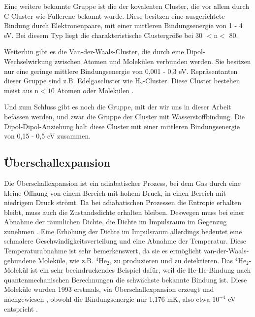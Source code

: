 Eine weitere bekannte Gruppe ist die der kovalenten Cluster, die vor allem durch C-Cluster wie Fullerene bekannt wurde. Diese besitzen eine ausgerichtete Bindung durch Elektronenpaare, mit einer mittleren Bindungsenergie von 1 - 4 eV. Bei diesem Typ liegt die charakteristische Clustergröße bei 30 $\mathrm{< n <}$ 80.

Weiterhin gibt es die Van-der-Waals-Cluster, die durch eine Dipol-Wechselwirkung zwischen Atomen und Molekülen verbunden werden. Sie besitzen nur eine geringe mittlere Bindungsenergie von 0,001 - 0,3 eV. Repräsentanten dieser Gruppe sind z.B. Edelgascluster wie $\mathrm{H}_2$-Cluster. Diese Cluster bestehen meist aus $\mathrm{n < 10}$ Atomen oder Molekülen .

Und zum Schluss gibt es noch die Gruppe, mit der wir uns in dieser Arbeit befassen werden, und zwar die Gruppe der Cluster mit Wasserstoffbindung. Die Dipol-Dipol-Anziehung hält diese Cluster mit einer mittleren Bindungsenergie von 0,15 - 0,5 eV zusammen. \\


\subsection{Überschallexpansion} \label{sec:uberschallexp}

Die Überschallexpansion ist ein adiabatischer Prozess, bei dem Gas durch eine kleine Öffnung von einem Bereich mit hohem Druck, in einen Bereich mit niedrigem Druck strömt. Da bei adiabatischen Prozessen die Entropie erhalten bleibt, muss auch die Zustandsdichte erhalten bleiben. Deswegen muss bei einer Abnahme der räumlichen Dichte, die Dichte im Impulsraum im Gegenzug zunehmen \cite{kurka07}. Eine Erhöhung der Dichte im Impulsraum allerdings bedeutet eine schmalere Geschwindigkeitsverteilung und eine Abnahme der Temperatur. Diese Temperaturabnahme ist sehr bemerkenswert, da sie es ermöglicht van-der-Waals-gebundene Moleküle, wie z.B. $\mathrm{^4}\mathrm{He}_2$, zu produzieren und zu detektieren. Das $\mathrm{^4}\mathrm{He}_2$-Molekül ist ein sehr beeindruckendes Beispiel dafür, weil die He-He-Bindung nach quantenmechanischen Berechnungen die schwächste bekannte Bindung ist. Diese Moleküle wurden 1993 erstmals, via Überschallexpansion erzeugt und nachgewiesen \cite{Luo1993}, obwohl die Bindungsenergie  nur 1,176 mK, also etwa $\mathrm{10^{-4}}$ eV entspricht \cite{Lohr2007}. 

